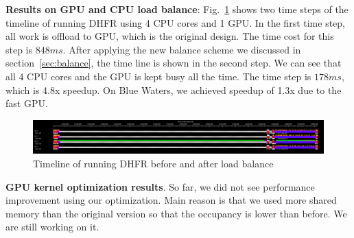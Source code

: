   \textbf{Results on GPU and CPU load balance}: Fig.~\ref{figs:cpu-gpu-balance} 
  shows two time steps of the timeline of running DHFR using 4 CPU cores and 1 GPU. 
  In the first time step, all work is offload to GPU, which is the original design.
  The time cost for this step is $848 ms$. After applying the new balance scheme
  we discussed in section~\ref{sec:balance}, the time line is shown in the second step.
  We can see that all 4 CPU cores and the GPU is kept busy all the time. The time step 
  is $178 ms$, which is 4.8x speedup.
On Blue Waters, we achieved speedup of 1.3x due to the fast GPU.

\begin{figure}[h]
\centering
\includegraphics[width=6.5in]{figs/gpu-cpu-balance-timeline.png}
\caption{Timeline of running DHFR before and after load balance}
\label{figs:cpu-gpu-balance}
\end{figure}

\textbf{GPU kernel optimization results}. So far, we did not see performance improvement using 
our optimization. Main reason is that we used more shared memory than the original version 
so that the occupancy is lower than before. We are still working on it.
